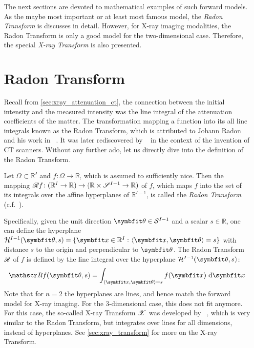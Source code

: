The next sections are devoted to mathematical examples of such forward models. As the maybe most
important or at least most famous model, the \textit{Radon Transform} is discusses in detail.
However, for X-ray imaging modalities, the Radon Transform is only a good model for the
two-dimensional case. Therefore, the special \textit{X-ray Transform} is also presented.

\section{Radon Transform}\label{sec:radon_transform}

Recall from \autoref{sec:xray_attenuation_ct}, the connection between the initial intensity and the
measured intensity was the line integral of the attenuation coefficients of the matter. The
transformation mapping a function into its all line integrals known as the Radon Transform, which is
attributed to Johann Radon and his work in
\citeyear{radon_uber_1917}~\cite{radon_uber_1917,radon_determination_1986}. It was later
rediscovered by \citeauthor{cormack_representation_1963}~\cite{cormack_representation_1963} in the
context of the invention of CT scanners. Without any further ado, let us directly dive into the
definition of the Radon Transform.

\begin{definition}\label{def:radon_transform}
	Let \(\Omega \subset \mathbb{R}^I\) and \(f\colon \Omega \to \mathbb{R}\), which is assumed
	to sufficiently nice. Then the mapping \(\radon f\colon (\mathbb{R}^I \to \mathbb{R})
	\to (\mathbb{R} \times \mathscr{S}^{I-1} \to \mathbb{R})\) of \(f\), which maps \(f\) into
	the set of its integrals over the affine hyperplanes of \(\mathbb{R}^{I-1}\), is called the
	\textit{Radon Transform} (c.f.~\cite{natterer_mathematics_1986,buzug_computed_2008,carpio_inverse_2008}).
\end{definition}

Specifically, given the unit direction \(\mvec{\theta} \in \mathcal{S}^{I-1}\) and a scalar \(s \in
\mathbb{R}\), one can define the hyperplane \(\mathcal{H}^{I-1}(\mvec{\theta}, s) = \lbrace \mvec{x}
\in \mathbb{R}^I \, \colon \langle \mvec{x}, \mvec{\theta} \rangle = s  \rbrace\) with distance
\(s\) to the origin and perpendicular to \(\mvec{\theta}\). The Radon Transform \(\mathscr{R}\) of \(f\)
is defined by the line integral over the hyperplane \(\mathcal{H}^{I-1}(\mvec{\theta}, s)\):
\begin{equation}\label{eq:radon_transform}
	\radon f(\mvec{\theta}, s) = \int_{\langle \mvec{x}, \mvec{\theta} \rangle = s} f(\mvec{x}) \, \, \mathrm{d}\mvec{x}
\end{equation}
Note that for \(n=2\) the hyperplanes are lines, and hence match the forward model for X-ray
imaging. For the 3-dimensional case, this does not fit anymore. For this case, the so-called X-ray
Transform \(\mathscr{X}\) was developed by \citeauthor*{solmon_x-ray_1976}~\cite{solmon_x-ray_1976}, which
is very similar to the Radon Transform, but integrates over lines for all dimensions, instead of
hyperplanes. See \autoref{sec:xray_transform} for more on the X-ray Transform.

